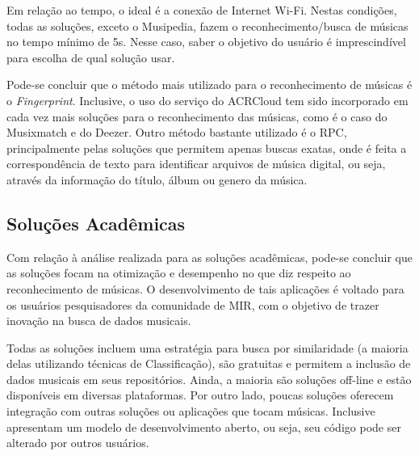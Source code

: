 
Em relação ao tempo, o ideal é a conexão de Internet Wi-Fi. Nestas condições, todas as soluções, exceto o Musipedia, fazem o reconhecimento/busca de músicas no tempo mínimo de 5s. Nesse caso, saber o objetivo do usuário é imprescindível para escolha de qual solução usar.

Pode-se concluir que o método mais utilizado para o reconhecimento de músicas é o \textit{Fingerprint}. Inclusive, o uso do serviço do ACRCloud tem sido incorporado em cada vez mais soluções para o reconhecimento das músicas, como é o caso do Musixmatch e do Deezer. Outro método bastante utilizado é o RPC, principalmente pelas soluções que permitem apenas buscas exatas, onde é feita a correspondência de texto para identificar arquivos de música digital, ou seja, através da informação do título, álbum ou genero da música.


\subsection{Soluções Acadêmicas}

Com relação à análise realizada para as soluções acadêmicas, pode-se concluir que as soluções focam na otimização e desempenho no que diz respeito ao reconhecimento de músicas. O desenvolvimento de tais aplicações é voltado para os usuários pesquisadores da comunidade de MIR, com o objetivo de trazer inovação na busca de dados musicais.

Todas as soluções incluem uma estratégia para busca por similaridade (a maioria delas utilizando técnicas de Classificação), são gratuitas e permitem a inclusão de dados musicais em seus repositórios. Ainda, a maioria são soluções off-line e estão disponíveis em diversas plataformas. Por outro lado, poucas soluções oferecem integração com outras soluções ou aplicações que tocam músicas. Inclusive apresentam um modelo de desenvolvimento aberto, ou seja, seu código pode ser alterado por outros usuários.

